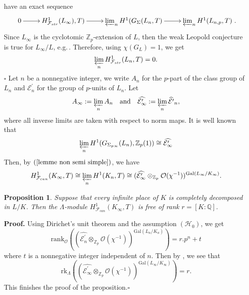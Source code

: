 \documentclass[reqno]{amsart}
\newcounter{dummy} \numberwithin{dummy}{section}
\newtheorem{pro}[dummy]{Proposition}
\begin{document}
have an exact sequence
$$
\xymatrix@=2pc{0\ar[r]&H^{1}_{\mathcal{F}_{str}}(L_{\infty}),T)\ar[r]&\varprojlim_{n}H^{1}(G_{\Sigma}(L_{n},T)\ar[r]&
\varprojlim_{n}H^{1}(L_{n,p},T)}.
$$
Since $L_{\infty}$ is the cyclotomic $\mathbb{Z}_{p}$-extension of
$L$, then the weak Leopold conjecture is true for $L_{\infty}/L$,
e.g.\,\cite[Theorem 10.3.25]{NSW91}. Therefore, using
$\chi(G_{L})=1$, we get
$$
\varprojlim_{n}H^{1}_{\mathcal{F}_{str}}(L_{n},T)=0.
$$
 \hfill
$\square$\vskip 6pt Let $n$ be a nonnegative integer, we write
$A_{n}$ for the $p$-part of the class group of $L_{n}$ and
$\mathcal{E}^{\prime}_{n}$ for the group of $p$-units of $L_{n}$.
Let
$$
A_{\infty}:=\varprojlim_{n}A_{n}\quad \mbox{and}\quad
\widehat{\mathcal{E}^{\prime}_{\infty}}:=\varprojlim_{n}\widehat{\mathcal{E}^{\prime}}_{n},
$$
 where all inverse limits are taken with respect to norm maps. It is well known that
$$
\varprojlim_{n}H^{1}(G_{\Sigma_{p\infty}}(L_{n}),\mathbb{Z}_{p}(1))\cong
\widehat{\mathcal{E}^{\prime}_{\infty}}
$$
Then, by $(\ref{lemme non semi simple})$, we have
\begin{equation}\label{Fcan and units }
H^{1}_{\mathcal{F}_{can}}(K_{\infty},T)\cong
\varprojlim_{n}H^{1}(K_{n},T)\cong
(\widehat{\mathcal{E}^{\prime}_{\infty}}\otimes_{\mathbb{Z}_{p}}\mathcal{O}(\chi^{-1}))^{\mathrm{Gal}(L_{\infty}/K_{\infty})}.
\end{equation}
\begin{pro}\label{Proposition fcan is free of rank r}
Suppose that every infinite place of $K$ is completely decomposed in
$L/K$. Then the $\Lambda$-module
$H^{1}_{\mathcal{F}_{can}}(K_{\infty},T)$ is free of rank
$r=[K:\mathbb{Q}].$
\end{pro}
\noindent \textbf{Proof.} Using Dirichet's unit theorem and the
assumption $(\mathcal{H}_{0})$, we get
$$
\mathrm{rank}_{\mathcal{O}}((\widehat{\mathcal{E}^{\prime}_{n}}
\otimes_{\mathbb{Z}_{p}}\mathcal{O}(\chi^{-1}))^{\mathrm{Gal}(L_{n}/K_{n})})=r.p^{n}+t
$$
where $t$ is a nonnegative integer independent of $n$. Then by
\cite[Theorem]{Greither94}, we see that
$$
\mathrm{rk}_{\Lambda}((\widehat{\mathcal{E}^{\prime}_{\infty}}
\otimes_{\mathbb{Z}_{p}}\mathcal{O}(\chi^{-1}))^{\mathrm{Gal}(L_{\infty}/K_{\infty})})=r.
$$
This finishes the proof of the proposition.\hfill $\square$\vskip
6pt
\end{document}
